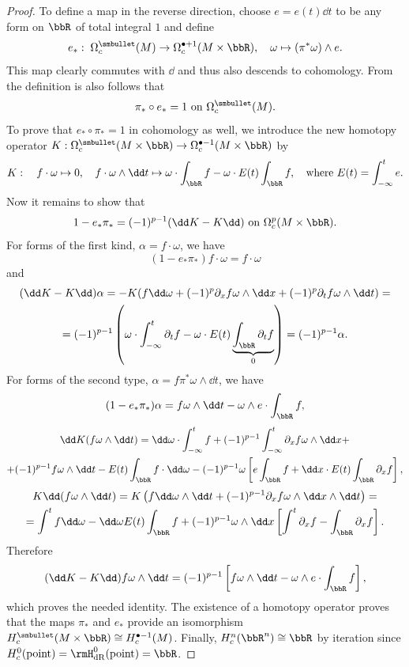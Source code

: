 \begin{proof}
    To define a map in the reverse direction, choose $e=e(t)\dd t$ to be any form on $\bbR$ of total integral $1$ and define
    \[e_\ast: \; \Omega_c^{\smbullet }(M)\to \Omega_c^{\bullet+1}(M\times\bbR),\quad \omega\mapsto (\pi^\ast \omega)\wedge e.\]
    This map clearly commutes with $\dd$ and thus also descends to cohomology. From the definition is also follows that 
    \[\pi_\ast\circ e_\ast=1 \text{ on }\Omega_c^{\smbullet }(M).\]
    To prove that $e_\ast\circ \pi_\ast=1$ in cohomology as well, we introduce the new homotopy operator $K:\Omega_c^{\smbullet }(M\times\bbR)\to \Omega_c^{\bullet-1}(M\times \bbR)$ by
    \begin{equation}
        K: \quad f\cdot\omega\mapsto 0,    \quad f\cdot \omega\wedge\dd t\mapsto  \omega\cdot\int_\bbR f-\omega\cdot E(t)\int_\bbR f,\quad \text{where } E(t)=\int_{-\infty}^t e.
    \end{equation}
    Now it remains to show that 
    \[1-e_\ast\pi_\ast=(-1)^{p-1}(\dd K-K\dd)\text{ on }\Omega_c^p(M\times\bbR).\]
    For forms of the first kind, $\alpha=f\cdot\omega$, we have
    \[(1-e_\ast\pi_\ast)f\cdot\omega=f\cdot\omega\]
    and
    \begin{multline}
        (\dd K-K \dd)\alpha=-K(f\dd\omega+(-1)^p\partial_x f \omega\wedge\dd x+(-1)^p \partial_t f \omega\wedge\dd t)
        =\\=(-1)^{p-1}\left(\omega\cdot \int_{-\infty}^t \partial_t f-\omega\cdot E(t) \underbrace{\int_\bbR \partial_t f}_0\right)=(-1)^{p-1}\alpha.
    \end{multline}
    For forms of the second type, $\alpha=f\pi^\ast \omega \wedge \dd t$, we have
    \[(1-e_\ast\pi_\ast)\alpha=f\omega\wedge\dd t- \omega\wedge e\cdot \int_\bbR f,\]
    \begin{multline}
        \dd K(f\omega\wedge\dd t)=\dd\omega\cdot \int_{-\infty}^t f+(-1)^{p-1}\int_{-\infty}^t \partial_x f\omega \wedge \dd x+\\+(-1)^{p-1}f\omega\wedge\dd t-E(t)\int_\bbR f\cdot \dd\omega-(-1)^{p-1}\omega \left[e\int_\bbR f+\dd x\cdot E(t)\int_\bbR \partial_x f\right],
    \end{multline}
    \begin{multline}
        K\dd (f\omega\wedge\dd t)=K\left(f\dd \omega\wedge\dd t+(-1)^{p-1}\partial_x f \omega\wedge\dd x\wedge\dd t\right)=\\=\int^t f\dd\omega-\dd\omega E(t)\int_\bbR f+(-1)^{p-1}\omega\wedge\dd x\left[ \int^t\partial_x f- \int_\bbR \partial_x f\right].
    \end{multline}
    Therefore
    \[(\dd K-K \dd )f\omega\wedge\dd t=(-1)^{p-1}\left[f\omega\wedge\dd t -\omega\wedge e\cdot\int_\bbR f\right],\]
    which proves the needed identity. The existence of a homotopy operator proves that the maps $\pi_\ast$ and $e_\ast$ provide an isomorphism
    $H_c^{\smbullet }(M\times\bbR)\cong H_c^{\bullet -1}(M)$. Finally, 
    $H_c^n(\bbR^n)\cong \bbR$ by iteration since $H_c^0(\text{point})=\rmH_{\rm dR}^0(\text{point})=\bbR$.
\end{proof}

